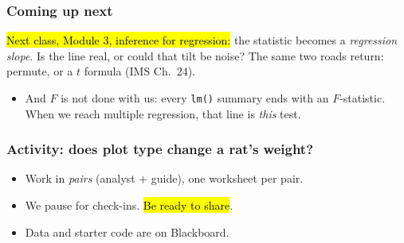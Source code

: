 \documentclass[slidestop,compress,mathserif]{beamer}
\begin{document}
\begin{frame}
\frametitle{Coming up next}

\hl{Next class, Module 3, inference for regression:} the statistic becomes a \emph{regression slope}. Is the line real, or could that tilt be noise? The same two roads return: permute, or a $t$ formula (IMS Ch.\ 24).

\vspace{0.4em}
\begin{itemize}
\item And $F$ is not done with us: every \texttt{lm()} summary ends with an $F$-statistic. When we reach multiple regression, that line is \emph{this} test.
\end{itemize}

\end{frame}



\begin{frame}
\frametitle{Activity: does plot type change a rat's weight?}


\vspace{0.3em}
{\small
\begin{itemize}
\item Work in \emph{pairs} (analyst + guide), one worksheet per pair.
\item We pause for check-ins. \hl{Be ready to share}.
\item Data and starter code are on Blackboard.
\end{itemize}}

\end{frame}



\end{document}
